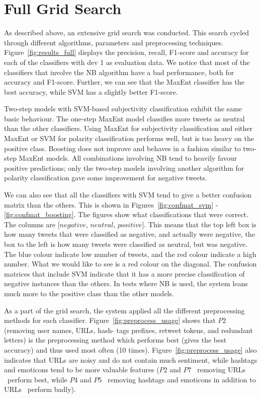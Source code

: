 \section{Full Grid Search}

As described above, an extensive grid search was conducted. This search cycled through different algorithms, parameters and preprocessing techniques. Figure~\ref{fig:results_full} displays the precision, recall, F1-score and accuracy for each of the classifiers with dev 1 as evaluation data. We notice that most of the classifiers that involve the NB algorithm have a bad performance, both for accuracy and F1-score. Further, we can see that the MaxEnt classifier has the best accuracy, while SVM has a slightly better F1-score.

Two-step models with SVM-based subjectivity classification exhibit the same basic behaviour. The one-step MaxEnt model classifies more tweets as neutral than the other classifiers. Using MaxEnt for subjectivity classification and either MaxEnt or SVM for polarity classification performs well, but is too heavy on the positive class. Boosting does not improve and behaves in a fashion similar to two-step MaxEnt models. All combinations involving NB tend to heavily favour positive predictions; only the two-step models involving another algorithm for polarity classification gave some improvement for negative tweets.

We can also see that all the classifiers with SVM tend to give a better confusion matrix than the others. This is shown in Figures~\ref{fig:confmat_svm} - \ref{fig:confmat_boosting}. The figures show what classifications that were correct. The columns are [$negative$, $neutral$, $positive$]. This means that the top left box is how many tweets that were classified as negative, and actually were negative, the box to the left is how many tweets were classified as neutral, but was negative. The blue colour indicate low number of tweets, and the red colour indicate a high number. What we would like to see is a red colour on the diagonal. The confusion matrices that include SVM indicate that it has a more precise classification of negative instances than the others. In tests where NB is used, the system leans much more to the positive class than the other models.

As a part of the grid search, the system applied all the different preprocessing methods for each classifier. Figure~\ref{fig:preprocess_usage} shows that $P2$ (removing user names, URLs, hash- tags prefixes, retweet tokens, and redundant letters) is the preprocessing method which performs best (gives the best accuracy) and thus used most often (10 times). Figure~\ref{fig:preprocess_usage} also indicates that URLs are noisy and do not contain much sentiment, while hashtags and emoticons tend to be more valuable features ($P2$ and $P7$ \textemdash~removing URLs \textemdash~perform best, while $P4$ and $P5$ \textemdash~removing hashtags and emoticons in addition to URLs \textemdash~perform badly).

